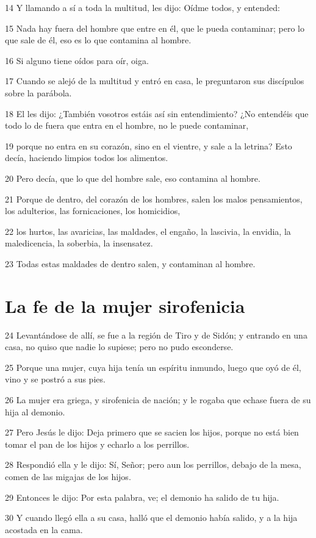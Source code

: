 \par 14 Y llamando a sí a toda la multitud, les dijo: Oídme todos, y entended:
\par 15 Nada hay fuera del hombre que entre en él, que le pueda contaminar; pero lo que sale de él, eso es lo que contamina al hombre.
\par 16 Si alguno tiene oídos para oír, oiga.
\par 17 Cuando se alejó de la multitud y entró en casa, le preguntaron sus discípulos sobre la parábola.
\par 18 El les dijo: ¿También vosotros estáis así sin entendimiento? ¿No entendéis que todo lo de fuera que entra en el hombre, no le puede contaminar,
\par 19 porque no entra en su corazón, sino en el vientre, y sale a la letrina? Esto decía, haciendo limpios todos los alimentos.
\par 20 Pero decía, que lo que del hombre sale, eso contamina al hombre.
\par 21 Porque de dentro, del corazón de los hombres, salen los malos pensamientos, los adulterios, las fornicaciones, los homicidios,
\par 22 los hurtos, las avaricias, las maldades, el engaño, la lascivia, la envidia, la maledicencia, la soberbia, la insensatez.
\par 23 Todas estas maldades de dentro salen, y contaminan al hombre.

\section*{La fe de la mujer sirofenicia}

\par 24 Levantándose de allí, se fue a la región de Tiro y de Sidón; y entrando en una casa, no quiso que nadie lo supiese; pero no pudo esconderse.
\par 25 Porque una mujer, cuya hija tenía un espíritu inmundo, luego que oyó de él, vino y se postró a sus pies.
\par 26 La mujer era griega, y sirofenicia de nación; y le rogaba que echase fuera de su hija al demonio.
\par 27 Pero Jesús le dijo: Deja primero que se sacien los hijos, porque no está bien tomar el pan de los hijos y echarlo a los perrillos.
\par 28 Respondió ella y le dijo: Sí, Señor; pero aun los perrillos, debajo de la mesa, comen de las migajas de los hijos.
\par 29 Entonces le dijo: Por esta palabra, ve; el demonio ha salido de tu hija.
\par 30 Y cuando llegó ella a su casa, halló que el demonio había salido, y a la hija acostada en la cama.

